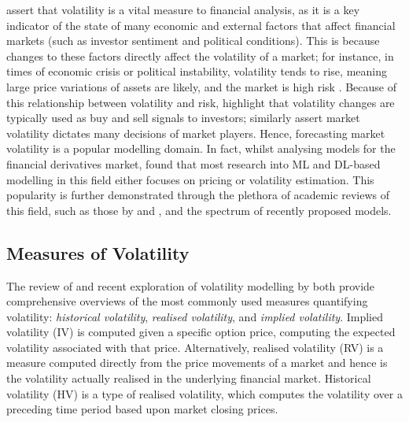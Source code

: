 \documentclass[a4paper, 11pt]{report}
\begin{document}
    \citet{cavalcante-2016} assert that volatility is a vital measure to financial analysis, as it is a key indicator of the state of many economic and external factors that affect financial markets (such as investor sentiment and political conditions). This is because changes to these factors directly affect the volatility of a market; for instance, in times of economic crisis or political instability, volatility tends to rise, meaning large price variations of assets are likely, and the market is high risk \citep{sezer-2019}. Because of this relationship between volatility and risk, \citet{tino-2001} highlight that volatility changes are typically used as buy and sell signals to investors; \citet{ge-2022} similarly assert market volatility dictates many decisions of market players. Hence, forecasting market volatility is a popular modelling domain. In fact, whilst analysing models for the financial derivatives market, \citet{ozbayoglu-2020} found that most research into ML and DL-based modelling in this field either focuses on pricing or volatility estimation. This popularity is further demonstrated through the plethora of academic reviews of this field, such as those by \citet{poon-2003} and \citet{ge-2022}, and the spectrum of recently proposed models.

    \subsection{Measures of Volatility}

    The review of \citet{ge-2022} and recent exploration of volatility modelling by \citet{tino-2001} both provide comprehensive overviews of the most commonly used measures quantifying volatility: \emph{historical volatility}, \emph{realised volatility}, and \emph{implied volatility}. Implied volatility (IV) is computed given a specific option price, computing the expected volatility associated with that price. Alternatively, realised volatility (RV) is a measure computed directly from the price movements of a market and hence is the volatility actually realised in the underlying financial market. Historical volatility (HV) is a type of realised volatility, which computes the volatility over a preceding time period based upon market closing prices.
\end{document}
